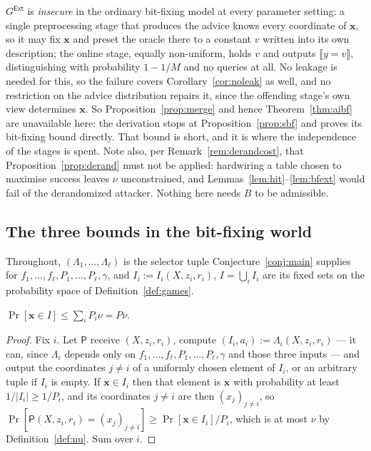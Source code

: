 \documentclass{conjura-conjecture}
\newcommand{\Prob}[1]{\Pr\!\left[#1\right]}
\newcommand{\vx}{\mathbf{x}}
\newcommand{\Ext}{\mathsf{Ext}}
\begin{document}
\begin{remark}
\label{rem:nomerge}
$G^{\Ext}$ is \emph{insecure} in the ordinary bit-fixing model at every
parameter setting: a single preprocessing stage that produces the advice
knows every coordinate of $\vx$, so it may fix $\vx$ and preset the oracle
there to a constant $v$ written into its own description; the online
stage, equally non-uniform, holds $v$ and outputs
$\llbracket y = v\rrbracket$, distinguishing with probability $1-1/M$ and
no queries at all. No leakage is needed for this, so the failure covers
Corollary~\ref{cor:noleak} as well, and no restriction on the advice
distribution repairs it, since the offending stage's own view determines
$\vx$. So Proposition~\ref{prop:merge} and hence
Theorem~\ref{thm:aibf} are unavailable here: the derivation stops at
Proposition~\ref{prop:sbf} and proves its bit-fixing bound directly. That
bound is short, and it is where the independence of the stages is spent.
Note also, per Remark~\ref{rem:derandcost}, that
Proposition~\ref{prop:derand} must not be applied: hardwiring a table
chosen to maximise success leaves $\nu$ unconstrained, and
Lemmas~\ref{lem:hit}--\ref{lem:bfext} would fail of the derandomized
attacker. Nothing here needs $B$ to be admissible.
\end{remark}

\subsection{The three bounds in the bit-fixing world}\label{sec:bf}

Throughout, $(\Lambda_1,\dots,\Lambda_\ell)$ is the selector tuple
Conjecture~\ref{conj:main} supplies for
$f_1,\dots,f_\ell,P_1,\dots,P_\ell,\gamma$, and $I_i := I_i(X,z_i,r_i)$,
$I = \bigcup_i I_i$ are its fixed sets on the probability space of
Definition~\ref{def:games}.

\begin{lemma}\label{lem:hit}
$\Prob{\vx \in I} \le \sum_i P_i\nu = P\nu$.
\end{lemma}

\begin{proof}
Fix $i$. Let $\mathsf{P}$ receive $(X,z_i,r_i)$, compute
$(I_i,a_i) := \Lambda_i(X,z_i,r_i)$ --- it can, since $\Lambda_i$ depends
only on $f_1,\dots,f_\ell,P_1,\dots,P_\ell,\gamma$ and those three inputs
--- and output the coordinates $j \ne i$ of a uniformly chosen element of
$I_i$, or an arbitrary tuple if $I_i$ is empty. If $\vx \in I_i$ then that
element is $\vx$ with probability at least $1/|I_i| \ge 1/P_i$, and its
coordinates $j \ne i$ are then $(x_j)_{j \ne i}$, so
$\Prob{\mathsf{P}(X,z_i,r_i) = (x_j)_{j\ne i}} \ge \Prob{\vx \in I_i}/P_i$,
which is at most $\nu$ by Definition~\ref{def:nu}. Sum over $i$.
\end{proof}
\end{document}
